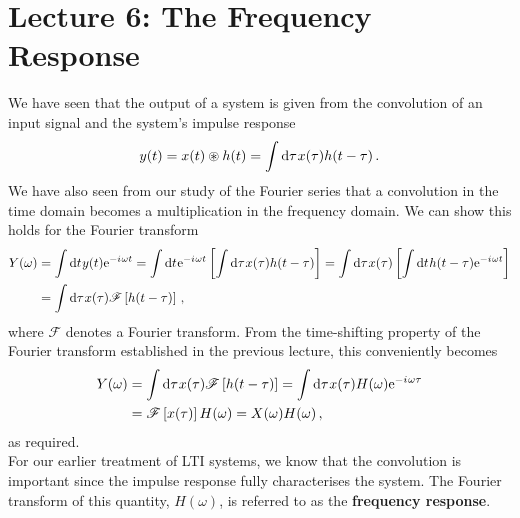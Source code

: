 \section{Lecture 6: The Frequency Response}

We have seen that the output of a system is given from the
convolution of an input signal and the system's impulse response
%
\begin{displaymath}
  y(t) = x(t) \circledast h(t) = \int\mathrm{d}\tau\mkern1mux(\tau)h(t-\tau) \,.
\end{displaymath}
%
We have also seen from our study of the Fourier series that a
convolution in the time domain becomes a multiplication in the
frequency domain. We can show this holds for the Fourier transform
%
\begin{align*}
  Y(\omega) &= \int\mathrm{d}t\mkern1mu y(t)\mathrm{e}^{-{i\mkern1mu}\omega t}
  = \int\mathrm{d}t\mkern1mu\mathrm{e}^{-{i\mkern1mu}\omega t}\left[\int\mathrm{d}\tau\mkern1mux(\tau)h(t-\tau)\right]
  = \int\mathrm{d}\tau\mkern1mux(\tau)\left[\int\mathrm{d}t\mkern1muh(t-\tau)\mathrm{e}^{-{i\mkern1mu}\omega t}\right] \\
  &= \int \mathrm{d}\tau\mkern1mux(\tau)\mathscr{F}\left[h(t-\tau)\right] \,,
\end{align*}
%
where $\mathscr{F}$ denotes a Fourier transform. From the time-shifting
property of the Fourier transform established in the previous lecture,
this conveniently becomes
%
\begin{align*}
  Y(\omega) &= \int \mathrm{d}\tau\mkern1mux(\tau)\mathscr{F}\left[h(t-\tau)\right]
  = \int \mathrm{d}\tau\mkern1mux(\tau)H(\omega)\mathrm{e}^{-{i\mkern1mu}\omega\tau} \\
  &= \mathscr{F}\left[x(\tau)\right]H(\omega) = X(\omega)H(\omega) \,,
\end{align*}
%
as required.\\

For our earlier treatment of LTI systems, we know that the convolution
is important since the impulse response fully characterises the system.
The Fourier transform of this quantity, $H(\omega)$, is referred to as
the \textbf{frequency response}.


